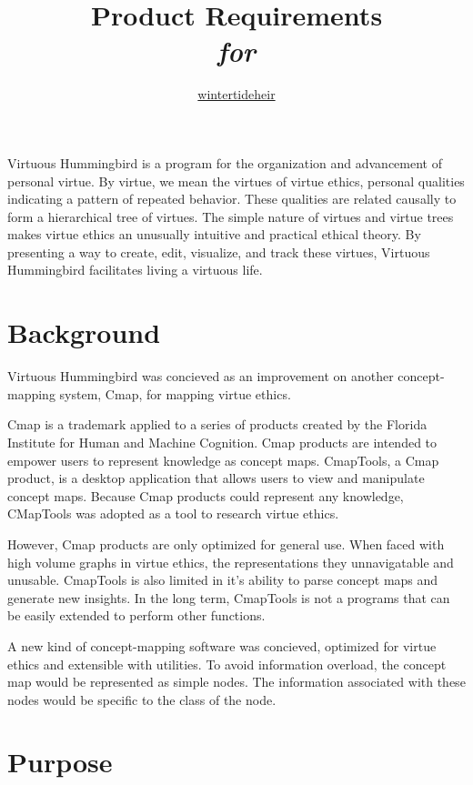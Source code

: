 \documentclass{article}
\title{Product Requirements \\ \textit{for} \\ \name{}}
\author{\href{https://github.com/wintertideheir}{wintertideheir}}
\newcommand{\name}{Virtuous Hummingbird}
\begin{document}
\maketitle

\name{} is a program for the organization and advancement of personal virtue.
By virtue, we mean the virtues of virtue ethics, personal qualities indicating a pattern of repeated behavior.
These qualities are related causally to form a hierarchical tree of virtues. 
The simple nature of virtues and virtue trees makes virtue ethics an unusually intuitive and practical ethical theory.
By presenting a way to create, edit, visualize, and track these virtues, \name{} facilitates living a virtuous life.

\tableofcontents

\section{Background}

\name{} was concieved as an improvement on another concept-mapping system, Cmap, for mapping virtue ethics.

Cmap is a trademark applied to a series of products created by the Florida Institute for Human and Machine Cognition.
Cmap products are intended to empower users to represent knowledge as concept maps.
CmapTools, a Cmap product, is a desktop application that allows users to view and manipulate concept maps.
Because Cmap products could represent any knowledge, CMapTools was adopted as a tool to research virtue ethics.

However, Cmap products are only optimized for general use.
When faced with high volume graphs in virtue ethics, the representations they unnavigatable and unusable.
CmapTools is also limited in it's ability to parse concept maps and generate new insights.
In the long term, CmapTools is not a programs that can be easily extended to perform other functions.

A new kind of concept-mapping software was concieved, optimized for virtue ethics and extensible with utilities.
To avoid information overload, the concept map would be represented as simple nodes.
The information associated with these nodes would be specific to the class of the node.

\section{Purpose}
\end{document}
